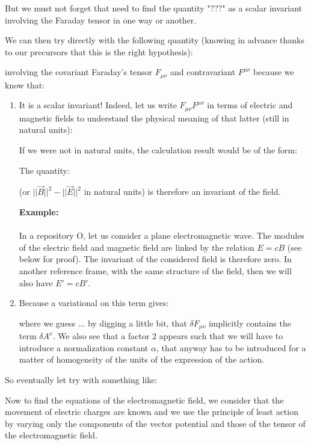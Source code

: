	But we must not forget that need to find the quantity "$???$" as a scalar invariant involving the Faraday tensor in one way or another.

	We can then try directly with the following quantity (knowing in advance thanks to our precursors that this is the right hypothesis):
	
	involving the covariant Faraday's tensor $F_{\mu\nu}$ and contravariant $F^{\mu \nu}$ because we know that:
	\begin{enumerate}
		\item It is a scalar invariant! Indeed, let us write $F_{\mu\nu}F^{\mu\nu}$ in terms of electric and magnetic fields to understand the physical meaning of that latter (still in natural units):
		
		\begin{tcolorbox}[title=Remark,colframe=black,arc=10pt]
		If we were not in natural units, the calculation result would be of the form:
		
		The quantity:
		
		(or $||\vec{B}||^2-||\vec{E}||^2$ in natural units) is therefore an invariant of the field.
		\end{tcolorbox}
		\begin{tcolorbox}[colframe=black,colback=white,sharp corners]
		\textbf{{\Large {}}Example:}\\\\
		In a repository O, let us consider a plane electromagnetic wave. The modules of the electric field and magnetic field are linked by the relation $E=cB$ (see below for proof). The invariant of the considered field is therefore zero. In another reference frame, with the same structure of the field, then we will also have $E'=cB'$.
		\end{tcolorbox}
		
		\item Because a variational on this term gives:
		
		where we guess ... by digging a little bit, that $\delta F_{\mu\nu}$ implicitly contains the term $\delta A^\nu$. We also see that a factor $2$ appears such that we will have to introduce a normalization constant $\alpha$,  that anyway has to be introduced for a matter of homogeneity of the units of the expression of the action.
	\end{enumerate}
	
	So eventually let try with something like:
	
	Now to find the equations of the electromagnetic field, we consider that the movement of electric charges are known and we use the principle of least action by varying only the components of the vector potential and those of the tensor of the electromagnetic field.

